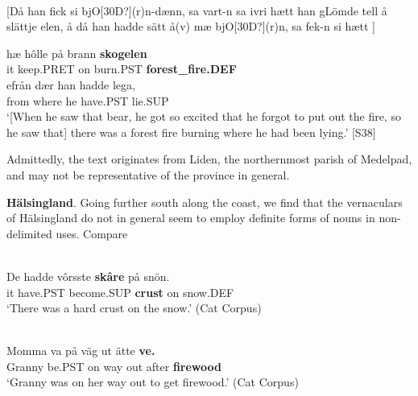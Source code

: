 



\ea\label{}
\\
{}[Då han fick si bjO[30D?](r)n{}-dænn, sa vart-n sa ivri hætt han gLömde tell å slättje elen, å då han hadde sätt å(v) mæ bjO[30D?](r)n, sa fek-n si hætt ]

\gll 	hæ  hôlle  på  brann  \textbf{skogelen}\\
		it  keep.PRET  on  burn.PST  \textbf{forest\_fire.DEF}\\
\gll 	efrån  dær  han  hadde  lega,\\
		from  where  he   have.PST  lie.SUP\\
\glt  	‘[When he saw that bear, he got so excited that he forgot to put out the fire, so he saw that] there was a forest fire burning where he had been lying.’ [S38]

\z

Admittedly, the text originates from Liden, the northernmost parish of Medelpad, and may not be representative of the province in general. 


\textbf{Hälsingland}. Going further south along the coast, we find that the vernaculars of Hälsingland do not in general seem to employ definite forms of nouns in non-delimited uses. Compare 


\ea \label{} 
\\
\gll De  hadde  vôrsste  \textbf{skâre} på  snön.\\
it  have.PST  become.SUP  \textbf{crust} on  snow.DEF\\
\glt ‘There was a hard crust on the snow.’ (Cat Corpus)

\z

\ea \label{} 
\\
\gll Momma  va  på  väg  ut  ätte  \textbf{ve.}\\
Granny  be.PST  on  way  out  after  \textbf{firewood}\\
\glt ‘Granny was on her way out to get firewood.’ (Cat Corpus)

